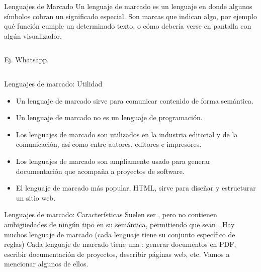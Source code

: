 
\begin{frame}{Lenguajes de Marcado}
  Un lenguaje de marcado es un lenguaje en donde algunos símbolos cobran un
  significado especial. Son marcas que indican algo, por ejemplo qué función
  cumple un determinado texto, o cómo debería verse en pantalla con algún
  visualizador.
  \jump
  \begin{columns}
    \begin{column}{0.3\textwidth}
      Ej. Whatsapp.
    \end{column}
    \begin{column}{0.3\textwidth}
    \end{column}
  \end{columns}
\end{frame}


\begin{frame}{Lenguajes de marcado: Utilidad}
  \begin{itemize}
    \item Un lenguaje de marcado sirve para comunicar contenido de forma semántica.
    \item Un lenguaje de marcado no es un lenguaje de programación.
    \item Los lenguajes de marcado son utilizados en la industria editorial y de
      la comunicación, así como entre autores, editores e impresores.
    \item Los lenguajes de marcado son ampliamente usado para generar documentación
      que acompaña a proyectos de software.
    \item El lenguaje de marcado más popular, HTML, sirve para diseñar y
      estructurar un sitio web.
  \end{itemize}
\end{frame}


\begin{frame}{Lenguajes de marcado: Características}
  Suelen ser , pero no contienen
  ambigüedades de ningún tipo en su semántica, permitiendo que sean
  .
  \jump
  Hay muchos lenguaje de marcado (cada lenguaje tiene su conjunto específico de reglas)
  \jump
  Cada lenguaje de marcado tiene una : generar
  documentos en PDF, escribir documentación de proyectos, describir páginas web, etc.
  \jump
  Vamos a mencionar algunos de ellos.
\end{frame}

